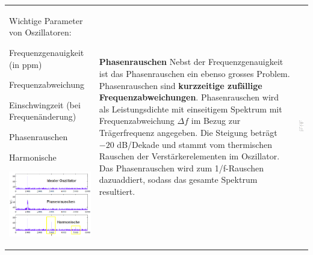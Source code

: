 \begin{tabular}{lll} 
\parbox{9cm}{
	Wichtige Parameter von Oszillatoren:
	\begin{liste}
		\item Frequenzgenauigkeit (in ppm)
		\item Frequenzabweichung
		\item Einschwingzeit (bei Frequenänderung)
		\item Phasenrauschen
		\item Harmonische
	\end{liste} 
   
    \includegraphics[width=9cm]{./bilder/components_oscillator_spectrum.png}} 

&	\parbox{5cm} {
	\textbf{Phasenrauschen}\\
	Nebst der Frequenzgenauigkeit ist das Phasenrauschen ein ebenso grosses
	Problem. Phasenrauschen sind \textbf{kurzzeitige zufällige
	Frequenzabweichungen}. \\
	Phasenrauschen wird als Leistungsdichte mit einseitigem Spektrum mit
	Frequenzabweichung $\Delta f$ im Bezug zur Trägerfrequenz angegeben.
	Die Steigung beträgt $-20$ dB/Dekade und stammt vom thermischen Rauschen der
	Verstärkerelementen im Oszillator.\\
	Das Phasenrauschen wird zum 1/f-Rauschen dazuaddiert, sodass das gesamte
	Spektrum resultiert. } & \parbox{4cm}{
    \includegraphics[width=4cm]{./bilder/components_oscillator_phase-noise.png}
    }
    \\
\end{tabular}

